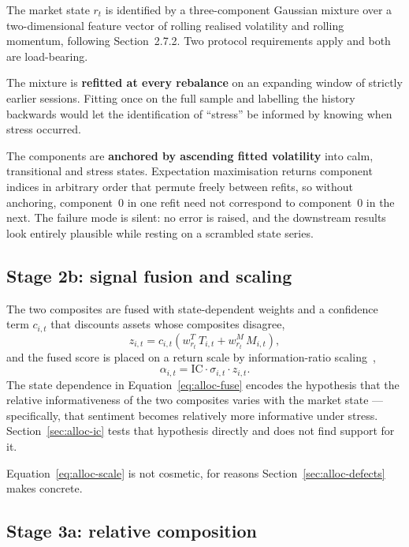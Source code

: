 The market state $r_t$ is identified by a three-component Gaussian mixture over a two-dimensional
feature vector of rolling realised volatility and rolling momentum, following Section~2.7.2. Two
protocol requirements apply and both are load-bearing.

The mixture is \textbf{refitted at every rebalance} on an expanding window of strictly earlier
sessions. Fitting once on the full sample and labelling the history backwards would let the
identification of ``stress'' be informed by knowing when stress occurred.

The components are \textbf{anchored by ascending fitted volatility} into calm, transitional and
stress states. Expectation maximisation returns component indices in arbitrary order that permute
freely between refits, so without anchoring, component~0 in one refit need not correspond to
component~0 in the next. The failure mode is silent: no error is raised, and the downstream results
look entirely plausible while resting on a scrambled state series.

\subsection{Stage 2b: signal fusion and scaling}

The two composites are fused with state-dependent weights and a confidence term $c_{i,t}$ that
discounts assets whose composites disagree,
\begin{equation}
z_{i,t} = c_{i,t}\left(w^{T}_{r_t}\, T_{i,t} + w^{M}_{r_t}\, M_{i,t}\right),
\label{eq:alloc-fuse}
\end{equation}
and the fused score is placed on a return scale by information-ratio
scaling~\cite{grinold2000},
\begin{equation}
\alpha_{i,t} = \mathrm{IC}\cdot\sigma_{i,t}\cdot z_{i,t}.
\label{eq:alloc-scale}
\end{equation}
The state dependence in Equation~\eqref{eq:alloc-fuse} encodes the hypothesis that the relative
informativeness of the two composites varies with the market state --- specifically, that
sentiment becomes relatively more informative under stress. Section~\ref{sec:alloc-ic} tests that
hypothesis directly and does not find support for it.

Equation~\eqref{eq:alloc-scale} is not cosmetic, for reasons Section~\ref{sec:alloc-defects}
makes concrete.

\subsection{Stage 3a: relative composition}


